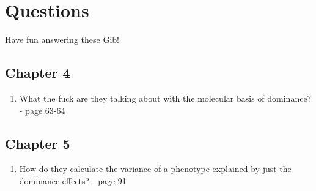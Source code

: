 \documentclass[
]{book}
\providecommand{\tightlist}{%
  \setlength{\itemsep}{0pt}\setlength{\parskip}{0pt}}
\begin{document}
\hypertarget{questions}{%
\chapter*{Questions}\label{questions}}

Have fun answering these Gib!

\hypertarget{chapter-4}{%
\section*{Chapter 4}\label{chapter-4}}

\begin{enumerate}
\def\labelenumi{\arabic{enumi}.}
\tightlist
\item
  What the fuck are they talking about with the molecular basis of dominance? - page 63-64
\end{enumerate}

\hypertarget{chapter-5}{%
\section*{Chapter 5}\label{chapter-5}}

\begin{enumerate}
\def\labelenumi{\arabic{enumi}.}
\tightlist
\item
  How do they calculate the variance of a phenotype explained by just the dominance effects? - page 91
\end{enumerate}
\end{document}
